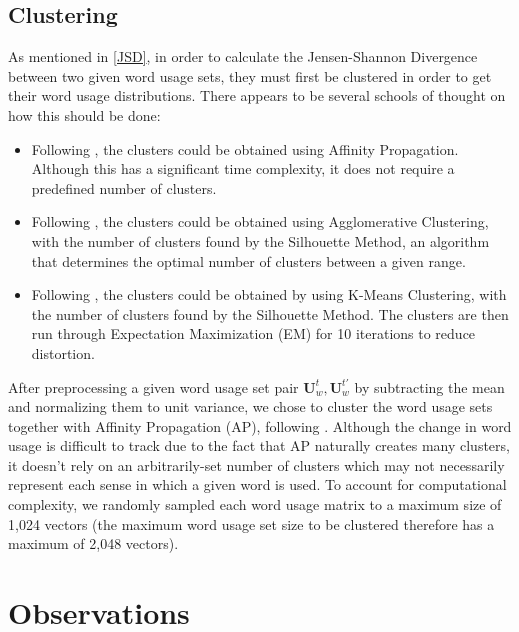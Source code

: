 \documentclass[10pt, a4paper]{article}
\begin{document}
\subsection{Clustering}
\label{clustering}
As mentioned in \ref{JSD}, in order to calculate the Jensen-Shannon Divergence between two given word usage sets, they must first be clustered in order to get their word usage distributions. There appears to be several schools of thought on how this should be done:
\begin{itemize}
    \item{Following , the clusters could be obtained using Affinity Propagation. Although this has a significant time complexity, it does not require a predefined number of clusters.}
    \item{Following , the clusters could be obtained using Agglomerative Clustering, with the number of clusters found by the Silhouette Method\cite{silhouette}, an algorithm that determines the optimal number of clusters between a given range.}
    \item{Following , the clusters could be obtained by using K-Means Clustering, with the number of clusters found by the Silhouette Method. The clusters are then run through Expectation Maximization (EM) for 10 iterations to reduce distortion.}
\end{itemize}

After preprocessing a given word usage set pair $\textbf{U}^{t}_w, \textbf{U}^{t'}_w$ by subtracting the mean and normalizing them to unit variance, we chose to cluster the word usage sets together with Affinity Propagation (AP), following \cite{Martinc2020,Kutuzov2020}. Although the change in word usage is difficult to track due to the fact that AP naturally creates many clusters, it doesn't rely on an arbitrarily-set number of clusters which may not necessarily represent each sense in which a given word is used. To account for computational complexity, we randomly sampled each word usage matrix to a maximum size of 1,024 vectors (the maximum word usage set size to be clustered therefore has a maximum of 2,048 vectors).

\section{Observations}
\end{document}

